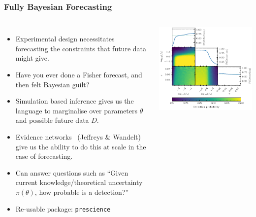 \documentclass[aspectratio=169]{beamer}
\begin{document}
\begin{frame}
    \frametitle{Fully Bayesian Forecasting~}
    \begin{columns}
        \begin{itemize}
            \item Experimental design necessitates forecasting the constraints that future data might give.
            \item Have you ever done a Fisher forecast, and then felt Bayesian guilt?
            \item Simulation based inference gives us the language to marginalise over parameters $\theta$ and possible future data $D$.
            \item Evidence networks~ (Jeffreys \& Wandelt) give us the ability to do this at scale in the case of forecasting.
            \item Can answer questions such as ``Given current knowledge/theoretical uncertainty $\pi(\theta)$, how probable is a detection?''
            \item Re-usable package: \texttt{prescience}
        \end{itemize}
        \includegraphics[width=\textwidth]{figures/fbf.pdf}
    \end{columns}
\end{frame}
\end{document}
